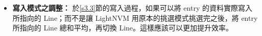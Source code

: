 \begin{itemize}
    \item\textbf{寫入模式之調整：}
    於\ref{s3.3}節的寫入過程，如果可以將 entry 的資料實際寫入所指向的 Line；而不是讓 LightNVM 用原本的挑選模式挑選完之後，將 entry 所指向的 Line 總和平均，再切換 Line。這樣應該可以更加提升效率。




\end{itemize}